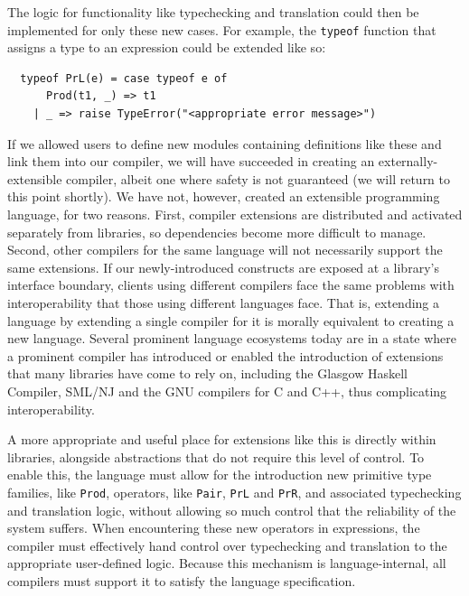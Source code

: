 \documentclass{llncs}
\begin{document}
The logic for functionality like typechecking and translation could then be implemented for only these new cases. For example, the \lstinline{typeof} function that assigns a type to an expression could be extended like so:
\begin{lstlisting}
  typeof PrL(e) = case typeof e of 
      Prod(t1, _) => t1 
    | _ => raise TypeError("<appropriate error message>")
\end{lstlisting}

If we allowed users to define new modules containing definitions like these and link them into our compiler, we will have succeeded in creating an externally-extensible compiler, albeit one where safety is not guaranteed (we will return to this point shortly). We have not, however, created an extensible programming language, for two reasons. First, compiler extensions are distributed and activated separately from libraries, so dependencies become more difficult to manage. Second, other compilers for the same language will not necessarily support the same extensions. 
If our newly-introduced constructs are exposed at a library's interface boundary, clients using different compilers face the same problems with interoperability that those using different languages face. That is, extending a language by extending a single compiler for it is morally equivalent to creating a new language. Several prominent language ecosystems today are in a state where a prominent compiler has introduced or enabled the introduction of extensions that many libraries have come to rely on, including the Glasgow Haskell Compiler, SML/NJ and the GNU compilers for C and C++, thus complicating interoperability.

A more appropriate and useful place for extensions like this is directly within libraries, alongside abstractions that do not require this level of control. To enable this, the language must allow for the introduction new primitive type families, like \lstinline{Prod}, operators, like \lstinline{Pair}, \lstinline{PrL} and \lstinline{PrR}, and associated typechecking and translation logic, without allowing so much control that the reliability of the system suffers. When encountering these new operators in expressions, the compiler must effectively  hand control over typechecking and translation to the appropriate user-defined logic. Because this mechanism is {language-internal}, all compilers must support it to satisfy the language specification.
\end{document}
